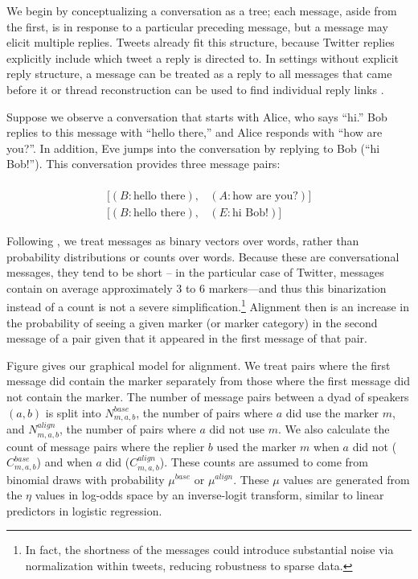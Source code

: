 \documentclass{acm_proc_article-sp}
\begin{document}
We begin by conceptualizing a conversation as a tree; each message, aside from the first, is in response to a particular preceding message, but a message may elicit multiple replies. Tweets already fit this structure, because Twitter replies explicitly include which tweet a reply is directed to.  In settings without explicit reply structure, a message can be treated as a reply to all messages that came before it \cite{WangReitterYen2014} or thread reconstruction can be used to find individual reply links \cite{JonesEtAl2014}.

Suppose we observe a conversation that starts with Alice, who says ``hi.'' Bob replies to this message with ``hello there,'' and Alice responds with ``how are you?''. In addition, Eve jumps into the conversation by replying to Bob (``hi Bob!''). This conversation provides three message pairs:

\begin{align*}
[(A, \textrm{hi}), & (B: \textrm{hello there})] \\
[(B: \textrm{hello there}), & (A: \textrm{how are you?})] \\
[(B: \textrm{hello there}), & (E: \textrm{hi Bob}!)] 
\end{align*}

Following \cite{DNMGamonDumais2011}, we treat messages as binary vectors over words, rather than probability distributions or counts over words.  Because these are conversational messages, they tend to be short -- in the particular case of Twitter, messages contain on average approximately 3 to 6 markers---and thus this binarization instead of a count is not a severe simplification.\footnote{In fact, the shortness of the messages could introduce substantial noise via normalization within tweets, reducing robustness to sparse data.}  Alignment then is an increase in the probability of seeing a given marker (or marker category) in the second message of a pair given that it appeared in the first message of that pair.

Figure \label{fig:model} gives our graphical model for alignment. We treat pairs where the first message did contain the marker separately from those where the first message did not contain the marker.  The number of message pairs between a dyad of speakers $(a,b)$ is split into $N^{base}_{m,a,b}$, the number of pairs where $a$ did use the marker $m$, and $N^{align}_{m,a,b}$, the number of pairs where $a$ did not use $m$.  We also calculate the count of message pairs where the replier $b$ used the marker $m$ when $a$ did not ($C^{base}_{m,a,b}$) and when $a$ did ($C^{align}_{m,a,b}$).   These counts are assumed to come from binomial draws with probability $\mu^{base}$ or $\mu^{align}$.  These $\mu$ values are generated from the $\eta$ values in log-odds space by an inverse-logit transform, similar to linear predictors in logistic regression.
\end{document}
